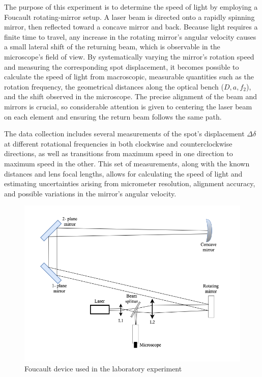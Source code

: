 
The purpose of this experiment is to determine the speed of light by employing a Foucault rotating-mirror setup. A laser beam is directed onto a rapidly spinning mirror, then reflected toward a concave mirror and back. Because light requires a finite time to travel, any increase in the rotating mirror’s angular velocity causes a small lateral shift of the returning beam, which is observable in the microscope’s field of view. By systematically varying the mirror’s rotation speed and measuring the corresponding spot displacement, it becomes possible to calculate the speed of light from macroscopic, measurable quantities such as the rotation frequency, the geometrical distances along the optical bench (\(D, a, f_2\)), and the shift observed in the microscope. The precise alignment of the beam and mirrors is crucial, so considerable attention is given to centering the laser beam on each element and ensuring the return beam follows the same path. 


The data collection includes several measurements of the spot’s displacement  \(\Delta\delta\) at different rotational frequencies in both clockwise and counterclockwise directions, as well as transitions from maximum speed in one direction to maximum speed in the other. This set of measurements, along with the known distances and lens focal lengths, allows for calculating the speed of light and estimating uncertainties arising from micrometer resolution, alignment accuracy, and possible variations in the mirror’s angular velocity.


\begin{figure}[h]
    \centering
    \includegraphics[width=\linewidth]{LightSpeed/image123.png}
    \caption{Foucault device used in the laboratory experiment}
    \label{fig:foucault}
\end{figure}
